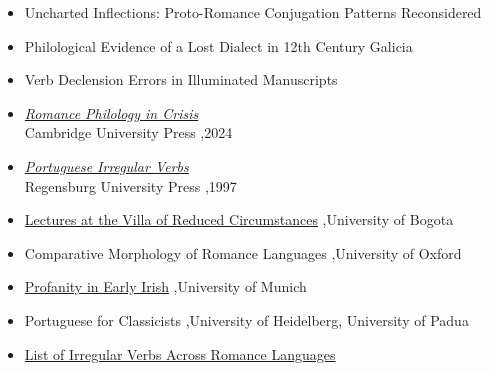 \documentclass[letterpaper,10pt]{article}
\begin{document}

\begin{itemize}
\item Uncharted Inflections: Proto-Romance Conjugation Patterns Reconsidered 
\item Philological Evidence of a Lost Dialect in 12th Century Galicia
\item Verb Declension Errors in Illuminated Manuscripts 
\end{itemize}


\begin{itemize}
\item \href{http://www.alexandermccallsmith.com/book/portuguese-irregular-verbs}{\textit{Romance Philology in Crisis}}  \\
Cambridge University Press \sep 2024
\item \href{https://pascalmichaillat.org/hugo-website/books/book1/}{\textit{Portuguese Irregular Verbs}}\\
Regensburg University Press \sep 1997
\end{itemize}


\begin{itemize}
\item \href{https://pascalmichaillat.org/hugo-website/courses/course1/}{Lectures at the Villa of Reduced Circumstances} \sep University of Bogota
\item Comparative Morphology of Romance Languages \sep University of Oxford
\end{itemize}


\begin{itemize}
\item \href{https://pascalmichaillat.org/hugo-website/courses/course2/}{Profanity in Early Irish} \sep University of Munich
\item Portuguese for Classicists \sep University of Heidelberg, University of Padua
\end{itemize}


\begin{itemize}
\item \href{https://pascalmichaillat.org/hugo-website/data/data1/}{List of Irregular Verbs Across Romance Languages} 
\end{itemize}
\end{document}
